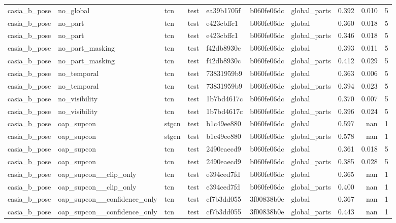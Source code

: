 \begin{tabular}{lllllllrrr}
casia\_b\_pose & no\_global & tcn & test & ea39b1705f & b060fe06dc & global\_parts & 0.392 & 0.010 & 5 \\
casia\_b\_pose & no\_part & tcn & test & e423cbffc1 & b060fe06dc & global & 0.360 & 0.018 & 5 \\
casia\_b\_pose & no\_part & tcn & test & e423cbffc1 & b060fe06dc & global\_parts & 0.346 & 0.018 & 5 \\
casia\_b\_pose & no\_part\_masking & tcn & test & f42db8930c & b060fe06dc & global & 0.393 & 0.011 & 5 \\
casia\_b\_pose & no\_part\_masking & tcn & test & f42db8930c & b060fe06dc & global\_parts & 0.412 & 0.029 & 5 \\
casia\_b\_pose & no\_temporal & tcn & test & 73831959b9 & b060fe06dc & global & 0.363 & 0.006 & 5 \\
casia\_b\_pose & no\_temporal & tcn & test & 73831959b9 & b060fe06dc & global\_parts & 0.394 & 0.023 & 5 \\
casia\_b\_pose & no\_visibility & tcn & test & 1b7bd4617c & b060fe06dc & global & 0.370 & 0.007 & 5 \\
casia\_b\_pose & no\_visibility & tcn & test & 1b7bd4617c & b060fe06dc & global\_parts & 0.396 & 0.024 & 5 \\
casia\_b\_pose & oap\_supcon & stgcn & test & b1c49ee880 & b060fe06dc & global & 0.597 & nan & 1 \\
casia\_b\_pose & oap\_supcon & stgcn & test & b1c49ee880 & b060fe06dc & global\_parts & 0.578 & nan & 1 \\
casia\_b\_pose & oap\_supcon & tcn & test & 2490eaecd9 & b060fe06dc & global & 0.361 & 0.018 & 5 \\
casia\_b\_pose & oap\_supcon & tcn & test & 2490eaecd9 & b060fe06dc & global\_parts & 0.385 & 0.028 & 5 \\
casia\_b\_pose & oap\_supcon\_\_clip\_only & tcn & test & e394ced7fd & b060fe06dc & global & 0.365 & nan & 1 \\
casia\_b\_pose & oap\_supcon\_\_clip\_only & tcn & test & e394ced7fd & b060fe06dc & global\_parts & 0.400 & nan & 1 \\
casia\_b\_pose & oap\_supcon\_\_confidence\_only & tcn & test & cf7b3dd055 & 3f00838b0e & global & 0.367 & nan & 1 \\
casia\_b\_pose & oap\_supcon\_\_confidence\_only & tcn & test & cf7b3dd055 & 3f00838b0e & global\_parts & 0.443 & nan & 1 \\
\end{tabular}
